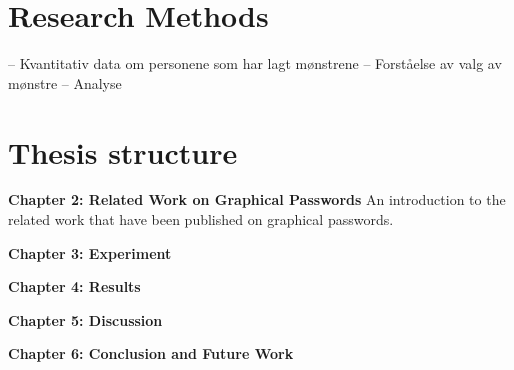 	\section{Research Methods} \label{sec:researchmethods}
		
			-- Kvantitativ data om personene som har lagt mønstrene
			-- Forståelse av valg av mønstre
			-- Analyse

	\section{Thesis structure} \label{sec:structure}

		{\bf Chapter 2: Related Work on Graphical Passwords}
		An introduction to the related work that have been published on graphical passwords. 

    {\bf Chapter 3: Experiment}

    {\bf Chapter 4: Results}

    {\bf Chapter 5: Discussion}

    {\bf Chapter 6: Conclusion and Future Work}


